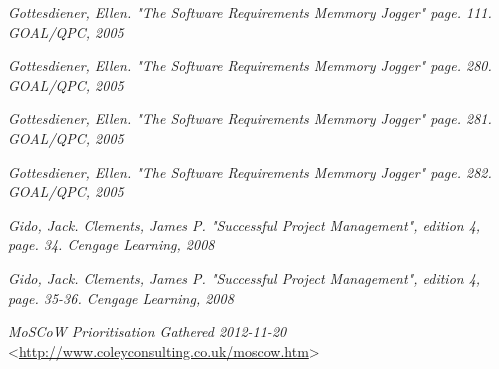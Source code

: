 \documentclass[a4paper]{article}
\begin{document}
\begin{thebibliography}{99}
 \emph{Gottesdiener, Ellen. \textsl{"The Software Requirements Memmory Jogger" page. 111}. GOAL/QPC, 2005}

 \emph{Gottesdiener, Ellen. \textsl{"The Software Requirements Memmory Jogger" page. 280}. GOAL/QPC, 2005}

 \emph{Gottesdiener, Ellen. \textsl{"The Software Requirements Memmory Jogger" page. 281}. GOAL/QPC, 2005}

 \emph{Gottesdiener, Ellen. \textsl{"The Software Requirements Memmory Jogger" page. 282}. GOAL/QPC, 2005}

 \emph{Gido, Jack. Clements, James P. \textsl{"Successful Project Management", edition 4, page. 34}. Cengage Learning, 2008}

 \emph{Gido, Jack. Clements, James P. \textsl{"Successful Project Management", edition 4, page. 35-36}. Cengage Learning, 2008}

 \emph{\textsl{MoSCoW Prioritisation} Gathered 2012-11-20} <\url{http://www.coleyconsulting.co.uk/moscow.htm}>

 

\end{thebibliography}
\end{document}
